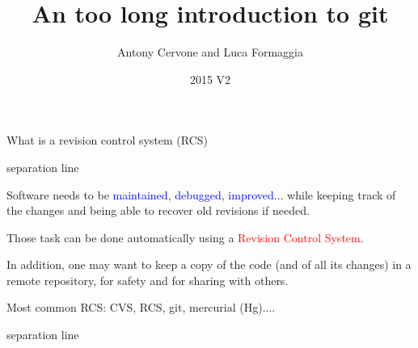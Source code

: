 \documentclass{beamer}
\author{ Antony Cervone and Luca Formaggia}
\title{An too long introduction to git}
\date{2015 V2}
\newcommand{\titleline}[1][0.025cm]{%
\begin{beamercolorbox}[wd=\paperwidth,ht=#1,center]{separation line}%
\end{beamercolorbox}%
}
\begin{document}
\begin{frame}
\titlepage
\end{frame}
\begin{frame}{What is a revision control system (RCS)}
\titleline
{\small
  Software needs to be \textcolor{blue}{maintained},
 \textcolor{blue}{debugged}, \textcolor{blue}{improved}...
while keeping track of the changes and being able to recover old revisions
if needed.
\smallskip

Those task can be done automatically using a \textcolor{red}{Revision Control System}.
\smallskip

In addition, one may want to keep a copy of the code (and of all its changes) in a remote repository, for safety and for sharing with others.

\smallskip

Most common RCS: CVS, RCS, git, mercurial (Hg)....
}
\titleline
\end{frame}
\end{document}
